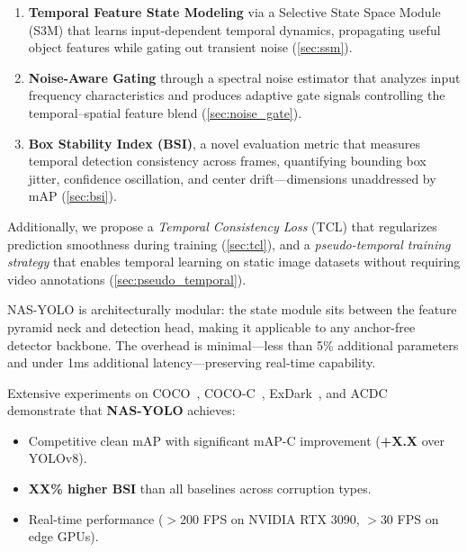 \documentclass[review]{eccv2026}
\newcommand{\ours}{\textbf{NAS-YOLO}}
\newcommand{\claimMapCGain}{X.X}
\newcommand{\claimBsiGainPct}{XX}
\begin{document}
\begin{enumerate}[leftmargin=1.5em,topsep=2pt,itemsep=1pt]
  \item[\textbf{C1.}] \textbf{Temporal Feature State Modeling} via a Selective State Space Module (S3M) that learns input-dependent temporal dynamics, propagating useful object features while gating out transient noise (\cref{sec:ssm}).

  \item[\textbf{C2.}] \textbf{Noise-Aware Gating} through a spectral noise estimator that analyzes input frequency characteristics and produces adaptive gate signals controlling the temporal--spatial feature blend (\cref{sec:noise_gate}).

  \item[\textbf{C3.}] \textbf{Box Stability Index (BSI)}, a novel evaluation metric that measures temporal detection consistency across frames, quantifying bounding box jitter, confidence oscillation, and center drift---dimensions unaddressed by mAP (\cref{sec:bsi}).
\end{enumerate}

\noindent
Additionally, we propose a \textit{Temporal Consistency Loss} (TCL) that regularizes prediction smoothness during training (\cref{sec:tcl}), and a \textit{pseudo-temporal training strategy} that enables temporal learning on static image datasets without requiring video annotations (\cref{sec:pseudo_temporal}).

NAS-YOLO is architecturally modular: the state module sits between the feature pyramid neck and detection head, making it applicable to any anchor-free detector backbone.
The overhead is minimal---less than 5\% additional parameters and under 1ms additional latency---preserving real-time capability.

Extensive experiments on COCO~\cite{coco}, COCO-C~\cite{cococ}, ExDark~\cite{exdark}, and ACDC~\cite{acdc} demonstrate that \ours{} achieves:
\begin{itemize}[leftmargin=1.5em,topsep=2pt,itemsep=1pt]
  \item Competitive clean mAP with significant mAP-C improvement (\textbf{+\claimMapCGain} over YOLOv8).
  \item \textbf{\claimBsiGainPct\% higher BSI} than all baselines across corruption types.
  \item Real-time performance ($>$200 FPS on NVIDIA RTX 3090, $>$30 FPS on edge GPUs).
\end{itemize}

\end{document}
